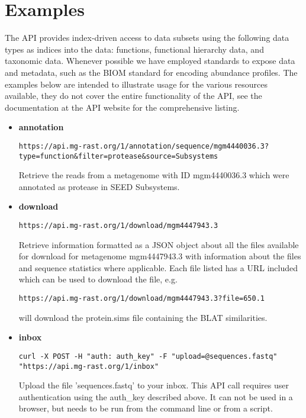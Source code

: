 \section{Examples}
The API provides index-driven access to data subsets using the following data types as indices into the data: functions, functional hierarchy data, and taxonomic data. Whenever possible we have employed standards to expose data and metadata, such as the BIOM standard for encoding abundance profiles. The examples below are intended to illustrate usage for the various resources available, they do not cover the entire functionality of the API, see the documentation at the API website for the comprehensive listing.

\begin{itemize}
\item
\textbf{annotation}
\begin{small}
\begin{lstlisting}
https://api.mg-rast.org/1/annotation/sequence/mgm4440036.3?type=function&filter=protease&source=Subsystems
\end{lstlisting}
\end{small} Retrieve the reads from a metagenome with ID mgm4440036.3 which were annotated as  protease in SEED Subsystems.

\item
\textbf{download}
\begin{small}
\begin{lstlisting}
https://api.mg-rast.org/1/download/mgm4447943.3
\end{lstlisting}
\end{small} Retrieve information formatted as a JSON object about all the files available for download for metagenome mgm4447943.3 with information about the files and sequence statistics where applicable. Each file listed has a URL included which can be used to download the file, e.g.
\begin{small}
\begin{lstlisting}
https://api.mg-rast.org/1/download/mgm4447943.3?file=650.1
\end{lstlisting}
\end{small} will download the protein.sims file containing the BLAT similarities.

\item
\textbf{inbox}
\begin{small}
\begin{lstlisting}
curl -X POST -H "auth: auth_key" -F "upload=@sequences.fastq" "https://api.mg-rast.org/1/inbox"
\end{lstlisting}
\end{small}
Upload the file 'sequences.fastq' to your inbox. This API call requires user authentication using the auth\_key described above. It can not be used in a browser, but needs to be run from the command line or from a script.


\end{itemize}
